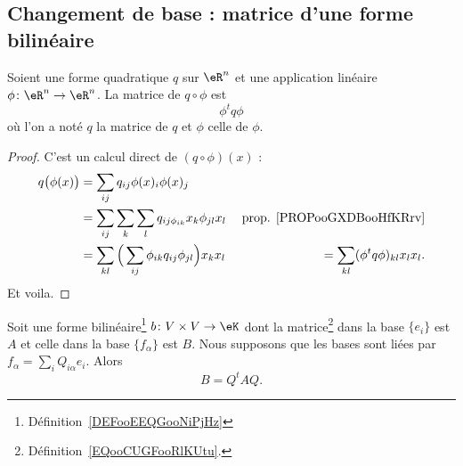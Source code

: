 \subsection{Changement de base : matrice d'une forme bilinéaire}

\begin{proposition}		\label{PROPooOKTGooOYukoB}
	Soient une forme quadratique \( q\) sur \( \eR^n\) et une application linéaire \(\phi \colon \eR^n\to \eR^n  \). La matrice de \( q\circ \phi\) est
	\begin{equation}
		\phi^tq\phi
	\end{equation}
	où l'on a noté \( q\) la matrice de \( q\) et \( \phi\) celle de \( \phi\).
\end{proposition}

\begin{proof}
	C'est un calcul direct de \( (q\circ\phi)(x)\) :
	\begin{subequations}
		\begin{align}
			q\big( \phi(x) \big) & =\sum_{ij}q_{ij}\phi(x)_i\phi(x)_j                                                                       \\
			                     & = \sum_{ij}\sum_k\sum_lq_{ij\phi_{ik}}x_k\phi_{jl}x_l            & \text{prop. \ref{PROPooGXDBooHfKRrv}} \\
			                     & = \sum_{kl}\Big( \sum_{ij}\phi_{ik}q_{ij}\phi_{jl} \Big)x_kx_l\
			                     & = \sum_{kl} (\phi^tq\phi)_{kl}x_lx_l.
		\end{align}
	\end{subequations}
	Et voila.
\end{proof}


\begin{proposition}     \label{PROPooLBIOooUpzxXA}
	Soit une forme bilinéaire\footnote{Définition~\ref{DEFooEEQGooNiPjHz}} \( b\colon V\times V\to \eK\) dont la matrice\footnote{Définition~\ref{EQooCUGFooRlKUtu}.} dans la base \( \{ e_i \}\) est \( A\) et celle dans la base \( \{ f_{\alpha} \}\) est \( B\). Nous supposons que les bases sont liées par \( f_{\alpha}=\sum_{i}Q_{i\alpha}e_i\). Alors
	\begin{equation}        \label{EQooZUVTooKjqnJj}
		B=Q^tAQ.
	\end{equation}
\end{proposition}

